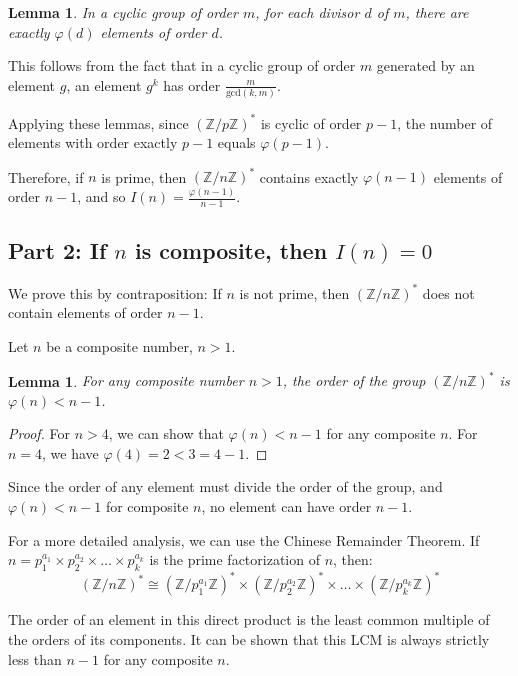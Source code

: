 \documentclass[11pt,a4paper]{article}
\newtheorem{lemma}[theorem]{Lemma}
\newcommand{\Z}{\mathbb{Z}}
\newcommand{\gcd}{\mathrm{gcd}}
\newcommand{\ZnZstar}[1]{(\Z/{#1}\Z)^{*}}
\newcommand{\totient}{\varphi}
\newcommand{\structinv}{I}
\begin{document}
\begin{lemma}
In a cyclic group of order $m$, for each divisor $d$ of $m$, there are exactly $\totient(d)$ elements of order $d$.
\end{lemma}

This follows from the fact that in a cyclic group of order $m$ generated by an element $g$, an element $g^k$ has order $\frac{m}{\gcd(k,m)}$.

Applying these lemmas, since $\ZnZstar{p}$ is cyclic of order $p-1$, the number of elements with order exactly $p-1$ equals $\totient(p-1)$.

Therefore, if $n$ is prime, then $\ZnZstar{n}$ contains exactly $\totient(n-1)$ elements of order $n-1$, and so $\structinv(n) = \frac{\totient(n-1)}{n-1}$.

\subsection{Part 2: If $n$ is composite, then $\structinv(n) = 0$}

We prove this by contraposition: If $n$ is not prime, then $\ZnZstar{n}$ does not contain elements of order $n-1$.

Let $n$ be a composite number, $n > 1$.

\begin{lemma}
For any composite number $n > 1$, the order of the group $\ZnZstar{n}$ is $\totient(n) < n-1$.
\end{lemma}

\begin{proof}
For $n > 4$, we can show that $\totient(n) < n-1$ for any composite $n$. For $n = 4$, we have $\totient(4) = 2 < 3 = 4-1$.
\end{proof}

Since the order of any element must divide the order of the group, and $\totient(n) < n-1$ for composite $n$, no element can have order $n-1$.

For a more detailed analysis, we can use the Chinese Remainder Theorem. If $n = p_1^{a_1} \times p_2^{a_2} \times \ldots \times p_k^{a_k}$ is the prime factorization of $n$, then:
\begin{equation}
\ZnZstar{n} \cong \ZnZstar{p_1^{a_1}} \times \ZnZstar{p_2^{a_2}} \times \ldots \times \ZnZstar{p_k^{a_k}}
\end{equation}

The order of an element in this direct product is the least common multiple of the orders of its components. It can be shown that this LCM is always strictly less than $n-1$ for any composite $n$.
\end{document}
